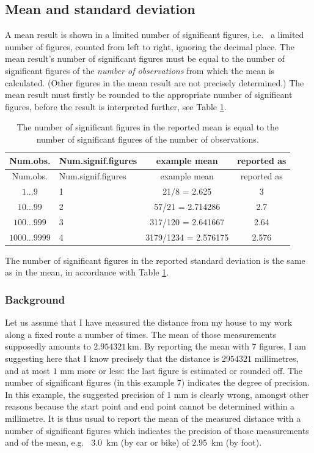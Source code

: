 \documentclass[
]{book}
\begin{document}
\hypertarget{sec:significantfigures-means}{%
\subsection{Mean and standard deviation}\label{sec:significantfigures-means}}

A mean result is shown in a limited number of significant figures, i.e.~
a limited number of figures, counted from left to right, ignoring the decimal place.
The mean result's number of significant figures must be equal to the
number of significant figures of the \emph{number of observations} from which the
mean is calculated. (Other figures in the mean result are not precisely
determined.) The mean result must firstly be rounded to the
appropriate number of significant figures, before the result is interpreted
further, see
Table \ref{tab:signiffiguresmean}.

\begin{longtable}[]{@{}clcc@{}}
\caption{\label{tab:signiffiguresmean} The number of significant figures in the reported mean is
equal to the number of significant figures of the number of observations.}\tabularnewline
\toprule\noalign{}
Num.obs. & Num.signif.figures & example mean & reported as \\
\midrule\noalign{}
\endfirsthead
\toprule\noalign{}
Num.obs. & Num.signif.figures & example mean & reported as \\
\midrule\noalign{}
\endhead
\bottomrule\noalign{}
\endlastfoot
\(1\dots9\) & 1 & 21/8 = 2.625 & 3 \\
\(10\dots99\) & 2 & 57/21 = 2.714286 & 2.7 \\
\(100\dots999\) & 3 & 317/120 = 2.641667 & 2.64 \\
\(1000\dots9999\) & 4 & 3179/1234 = 2.576175 & 2.576 \\
\end{longtable}

The number of significant figures in the reported standard deviation is
the same as in the mean, in accordance with
Table \ref{tab:signiffiguresmean}.

\hypertarget{background}{%
\subsubsection{Background}\label{background}}

Let us assume that I have measured the distance from my house to my work
along a fixed route a number of times. The mean of those measurements
supposedly amounts to \(2.954321\) km. By reporting the mean with 7 figures,
I am suggesting here that I know precisely that the distance is \(2954321\) millimetres,
and at most \(1\) mm more or less:
the last figure is estimated or rounded off. The number of significant figures
(in this example 7) indicates the degree of precision. In this example, the
suggested precision of 1 mm is clearly
wrong, amongst other reasons because the start point and end point cannot be determined
within a millimetre. It is thus usual to report the mean of the measured
distance with a number of significant figures which indicates the precision
of those measurements and of the mean, e.g.~
\(3.0\)~km (by car or bike) of \(2.95\)~km (by foot).
\end{document}
